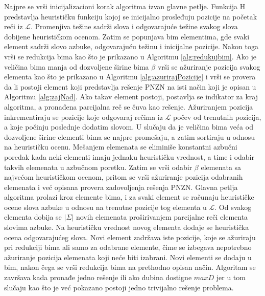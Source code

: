 \documentclass[12pt,oneside]{memoir}
\begin{document}
Najpre se vrši inicijalizacioni korak algoritma izvan glavne petlje.
Funkcija H predstavlja heurističku funkciju kojoj se inicijalno prosleđuju
pozicije na početak reči iz $\mathcal{L}$. Promenjiva težine sadrži slova i odgovarajuće
težine svakog slova dobijene heurističkom ocenom. Zatim se popunjava bim elementima, gde 
svaki element sadrži slovo azbuke, odgovarajuću težinu
i inicijalne pozicije. Nakon toga vrši se redukcija bima 
kao što je prikazano u Algoritmu \ref{alg:redukujbim}. Ako je veličina bima manja od
dozvoljene širine bima $\beta$ vrši se ažuriranje pozicija svakog elementa kao što je prikazano
u Algoritmu \ref{alg:azurirajPozicije} i vrši se provera da li postoji element koji predstavlja
rešenje PNZN na isti način koji je opisan u Algoritmu \ref{alg:zajNad}.
Ako takav element postoji, postavlja se indikator za kraj algoritma, a pronađena
parcijalna reč se čuva kao rešenje. Ažuriranjem pozicija inkrementiraju se pozicije koje odgovaraj
rečima iz $\mathcal{L}$ počev od trenutnih pozicija, a koje počinju poslednje dodatim slovom.
U slučaju da je veličina bima veća od dozvoljene širine elementi bima se najpre promešaju, a zatim
sortiraju u odnosu na heurističku ocenu. Mešanjem elemenata se eliminiše konstantni azbučni 
poredak kada neki elementi imaju jednaku heurističku vrednost, a time i odabir 
takvih elemenata u azbučnom poretku. Zatim se vrši odabir $\beta$ elemenata sa najvećom 
heurističkom ocenom, pritom se vrši ažuriranje pozicija odabranih elemenata i već opisana
provera zadovoljenja rešenja PNZN. Glavna petlja algoritma prolazi kroz elemente bima, 
i za svaki element se računaju heurističke ocene slova azbuke u odnosu na trenutne pozicije
tog elementa u $\mathcal{L}$. Od svakog elementa dobija se $|\Sigma|$ novih elemenata
proširivanjem parcijalne reči elementa slovima azbuke. Na heurističku vrednost novog elementa
dodaje se heuristička ocena odgovarajućeg slova. Novi element zadržava iste pozicije,
koje se ažuriraju pri redukciji bima ali samo za odabrane elemente, čime se 
izbegava nepotrebno ažuriranje pozicija elemenata koji neće biti izabrani.
Novi elementi se dodaju u bim, nakon čega se vrši redukcija bima na prethodno
opisan način. Algoritam se završava kada pronađe jedno rešenje ili
ako dubina dostigne $maxD$ jer u tom slučaju kao što je već pokazano postoji
jedno trivijalno rešenje problema.
\\
\end{document}
